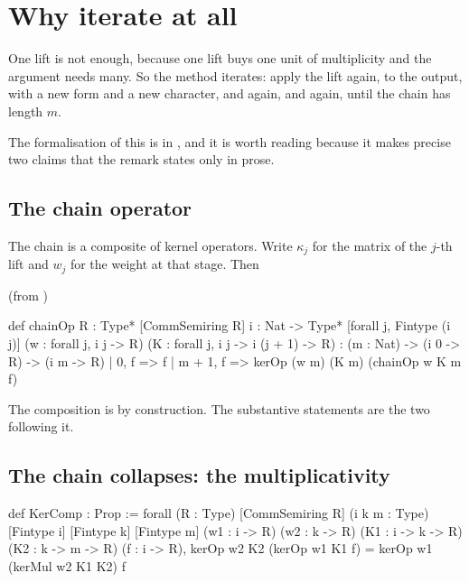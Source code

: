 \section{Why iterate at all}One lift is not enough, because one lift buys one unit of multiplicity and the
argument needs many. So the method iterates: apply the lift again, to the
output, with a new form and a new character, and again, and again, until the
chain has length $m$.

The formalisation of this is in
, and it is worth reading
because it makes precise two claims that the remark states only in prose.

\subsection{The chain operator}The chain is a composite of kernel operators. Write $\kappa_j$ for the matrix
of the $j$-th lift and $w_j$ for the weight at that stage. Then

\begin{seamnote}{ (from )}
{\footnotesize
\begin{leanquote}
def chainOp {R : Type*} [CommSemiring R] {i : Nat -> Type*}
  [forall j, Fintype (i j)]
(w : forall j, i j -> R) (K : forall j, i j -> i (j + 1) ->
      R) : (m : Nat) -> (i 0 -> R) -> (i m -> R)
  | 0, f => f
  | m + 1, f => kerOp (w m) (K m) (chainOp w K m f)
\end{leanquote}
}
\end{seamnote}

The composition is by construction. The substantive statements are the two
following it.

\subsection{The chain collapses: the multiplicativity}\begin{seamnote}{}
{\footnotesize
\begin{leanquote}
def KerComp : Prop :=
forall (R : Type) [CommSemiring R] (i k m : Type) [Fintype
    i] [Fintype k] [Fintype m]
(w1 : i -> R) (w2 : k -> R) (K1 : i -> k -> R) (K2 : k -> m
      -> R) (f : i -> R),
kerOp w2 K2 (kerOp w1 K1 f) = kerOp w1 (kerMul w2 K1 K2) f
\end{leanquote}
}
\end{seamnote}

